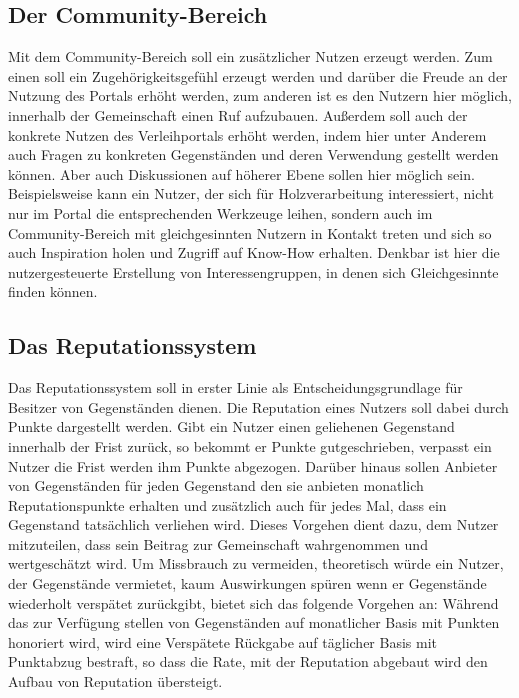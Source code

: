 \documentclass[a4paper]{scrartcl}
\begin{document}
\begin{multicols}{2}
		\subsection{Der Community-Bereich}
			Mit dem Community-Bereich soll ein zus\"atzlicher Nutzen erzeugt werden. Zum einen soll ein Zugeh\"origkeitsgef\"uhl erzeugt werden und dar\"uber die Freude an der Nutzung des Portals erh\"oht werden, zum anderen ist es den Nutzern hier m\"oglich, innerhalb der Gemeinschaft einen Ruf aufzubauen. Au\ss erdem soll auch der konkrete Nutzen des Verleihportals erh\"oht werden, indem hier unter Anderem auch Fragen zu konkreten Gegenst\"anden und deren Verwendung gestellt werden k\"onnen. Aber auch Diskussionen auf h\"oherer Ebene sollen hier m\"oglich sein. Beispielsweise kann ein Nutzer, der sich f\"ur Holzverarbeitung interessiert, nicht nur im Portal die entsprechenden Werkzeuge leihen, sondern auch im Community-Bereich mit gleichgesinnten Nutzern in Kontakt treten und sich so auch Inspiration holen und Zugriff auf Know-How erhalten. Denkbar ist hier die nutzergesteuerte Erstellung von Interessengruppen, in denen sich Gleichgesinnte finden k\"onnen.
			
		
		
		\subsection{Das Reputationssystem}
			Das Reputationssystem soll in erster Linie als Entscheidungsgrundlage f\"ur Besitzer von Gegenst\"anden dienen. Die Reputation eines Nutzers soll dabei durch Punkte dargestellt werden. Gibt ein Nutzer einen geliehenen Gegenstand innerhalb der Frist zur\"uck, so bekommt er Punkte gutgeschrieben, verpasst ein Nutzer die Frist werden ihm Punkte abgezogen. Dar\"uber hinaus sollen Anbieter von Gegenst\"anden f\"ur jeden Gegenstand den sie anbieten monatlich Reputationspunkte erhalten und zus\"atzlich auch f\"ur jedes Mal, dass ein Gegenstand tats\"achlich verliehen wird. Dieses Vorgehen dient dazu, dem Nutzer mitzuteilen, dass sein Beitrag zur Gemeinschaft wahrgenommen und wertgesch\"atzt wird. Um Missbrauch zu vermeiden, theoretisch w\"urde ein Nutzer, der Gegenst\"ande vermietet, kaum  Auswirkungen sp\"uren wenn er Gegenst\"ande wiederholt  versp\"atet zur\"uckgibt, bietet sich das folgende Vorgehen an: W\"ahrend das zur Verf\"ugung stellen von Gegenst\"anden auf monatlicher Basis mit Punkten honoriert wird, wird eine Versp\"atete R\"uckgabe auf t\"aglicher Basis mit Punktabzug bestraft, so dass die Rate, mit der Reputation abgebaut wird den Aufbau von Reputation übersteigt.
			

\end{multicols}
\end{document}
